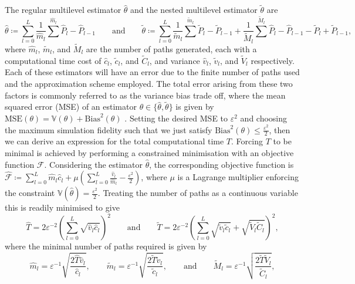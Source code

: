 \documentclass[manuscript,review]{acmart}
\begin{document}
The regular multilevel estimator $ \hat{\theta} $ and the nested multilevel estimator $ \tilde{\theta} $ are
\begin{equation*}
\hat{\theta}  \coloneqq \sum_{l=0}^{L} \dfrac{1}{\hat{m}_l} \sum^{\hat{m}_l} \hat{P}_l - \hat{P}_{l-1}
\qquad \text{and} \qquad
\tilde{\theta} \coloneqq \sum_{l=0}^L \dfrac{1}{\tilde{m}_l} \sum^{\tilde{m}_l} \tilde{P}_l - \tilde{P}_{l-1} + \dfrac{1}{\tilde{M}_l} \sum^{\tilde{M}_l} \hat{P}_l - \hat{P}_{l-1} - \tilde{P}_l + \tilde{P}_{l-1},
\end{equation*}
where $ \hat{m}_l $, $ \tilde{m}_l $, and $ \tilde{M}_l $ are the number of paths generated, each with a computational time cost of $ \hat{c}_l $, $ \tilde{c}_l $, and $ \tilde{C}_l $, and variance $ \hat{v}_l $, $ \tilde{v}_l $, and $ \tilde{V}_l $ respectively. Each of these estimators will have an error due to the finite number of paths used and the approximation scheme employed. The total error arising from these two factors is commonly referred to as the variance bias trade off, where the mean squared error (MSE) of an estimator $ \theta \in \{\hat{\theta}, \tilde{\theta}\} $ is given by $ \text{MSE}(\theta) = \mathbb{V}(\theta) + \text{Bias}^2(\theta)$ \citep[page~16]{glasserman2013monte}. Setting the desired MSE to $ \varepsilon^2 $ and choosing the maximum simulation fidelity such that we just satisfy $ \text{Bias}^2(\theta) \leq \tfrac{\varepsilon^2}{2} $, then we can derive an expression for the total computational time $ T $. Forcing $ T $ to be minimal is achieved by performing a constrained minimisation with an objective function $ \mathscr{F} $. Considering the estimator $ \hat{\theta} $, the corresponding objective function is $ \hat{\mathscr{F}} \coloneqq \sum_{l=0}^{L} \hat{m}_l \hat{c}_l + \mu (\sum_{l=0}^{L} \tfrac{\hat{v}_l}{\hat{m}_l} - \tfrac{\varepsilon^2}{2}) $, where $ \mu $ is a Lagrange multiplier enforcing the constraint $ \mathbb{V}(\hat{\theta}) = \tfrac{\varepsilon^2}{2} $. Treating the number of paths as a continuous variable this is readily minimised to give
\begin{equation*}
\hat{T} = 2\varepsilon^{-2}\left(\sum_{l=0}^L \sqrt{\hat{v}_l \hat{c}_l}\right)^2 
\qquad \text{and} \qquad 
\tilde{T} = 2\varepsilon^{-2} \left(\sum_{l=0}^L \sqrt{\tilde{v}_l \tilde{c}_l} + \sqrt{\tilde{V}_l \tilde{C}_l}\right)^2,
\end{equation*}
where the minimal number of paths required is given by
\begin{equation*}
\hat{m}_l = \varepsilon^{-1} \sqrt{\dfrac{2\hat{T}\hat{v}_l}{\hat{c}_l}},
\qquad 
\tilde{m}_l  = \varepsilon^{-1} \sqrt{\dfrac{2\tilde{T} \tilde{v}_l}{\tilde{c}_l}}, 
\qquad 
\text{and}
\qquad 
\tilde{M}_l  = \varepsilon^{-1} \sqrt{\dfrac{2\tilde{T} \tilde{V}_l}{\tilde{C}_l}},
\end{equation*}
\end{document}
